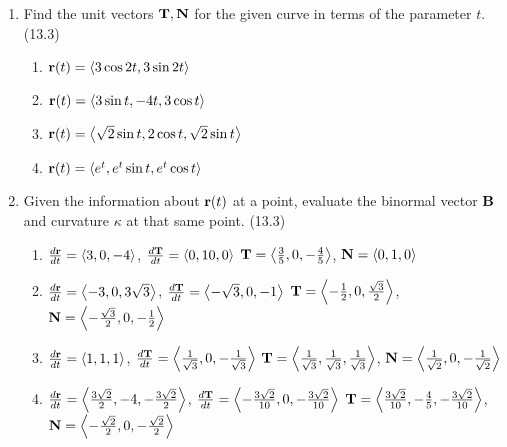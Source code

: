 \begin{enumerate}
    \item Find the unit vectors $\mathbf{T},\mathbf{N}$ for the given curve in terms of the parameter $t$. (13.3)

      \begin{enumerate}
        \item $\mathbf{r}(t) = \left<3\cos2t,3\sin2t \right>$
        \item $\mathbf{r}(t) = \left< 3\sin t, -4t, 3\cos t \right>$
        \item $\mathbf{r}(t) = \left< \sqrt{2}\sin t,2\cos t,\sqrt{2}\sin t \right>$
        \item $\mathbf{r}(t) = \left<e^t, e^t\sin t, e^t\cos t\right>$
      \end{enumerate}

    \newpage

    \item Given the information about $\mathbf{r}(t)$ at a point, evaluate the binormal vector $\mathbf{B}$ and curvature $\kappa$ at that same point. (13.3)

      \begin{enumerate}
        \item $\frac{d\mathbf{r}}{dt}=\left<3,0,-4\right>$, 
              $\frac{d\mathbf{T}}{dt}=\left<0,10,0\right>$ \newline
              $\mathbf{T}=\left<\frac{3}{5},0,-\frac{4}{5}\right>$, 
              $\mathbf{N}=\left<0,1,0\right>$
        \item $\frac{d\mathbf{r}}{dt}=\left<-3,0,3\sqrt{3}\right>$, 
              $\frac{d\mathbf{T}}{dt}=\left<-\sqrt{3},0,-1\right>$ \newline
              $\mathbf{T}=\left<-\frac{1}{2},0,\frac{\sqrt{3}}{2}\right>$, 
              $\mathbf{N}=\left<-\frac{\sqrt{3}}{2},0,-\frac{1}{2}\right>$
        \item $\frac{d\mathbf{r}}{dt}=\left<1,1,1\right>$, 
              $\frac{d\mathbf{T}}{dt}=\left<\frac{1}{\sqrt{3}},0,-\frac{1}{\sqrt{3}}\right>$ \newline
              $\mathbf{T}=\left<\frac{1}{\sqrt{3}},\frac{1}{\sqrt{3}},\frac{1}{\sqrt{3}}\right>$, 
              $\mathbf{N}=\left<\frac{1}{\sqrt{2}},0,-\frac{1}{\sqrt{2}}\right>$
        \item $\frac{d\mathbf{r}}{dt}=\left< \frac{3\sqrt{2}}{2}, -4, -\frac{3\sqrt{2}}{2}\right>$, 
              $\frac{d\mathbf{T}}{dt}=\left<-\frac{3\sqrt{2}}{10},0,-\frac{3\sqrt{2}}{10}\right>$\newline
              $\mathbf{T}=\left< \frac{3\sqrt{2}}{10}, -\frac{4}{5}, -\frac{3\sqrt{2}}{10}\right>$, 
              $\mathbf{N}=\left<-\frac{\sqrt{2}}{2},0,-\frac{\sqrt{2}}{2}\right>$
      \end{enumerate}


\end{enumerate}
